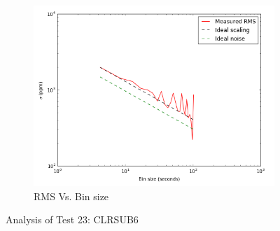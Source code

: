 \documentclass[conference]{IEEEtran}
\begin{document}
\begin{figure}[H]
    \begin{subfigure}{3}
        \includegraphics[scale=0.6]{rms_test23}
        \caption{RMS Vs. Bin size}
    \end{subfigure}
    \caption{Analysis of Test 23: CLRSUB6}
\end{figure}
\end{document}
